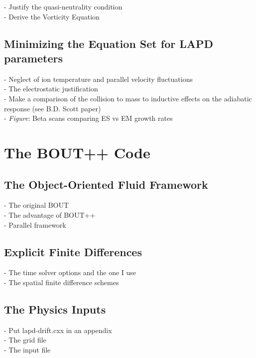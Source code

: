 \documentclass[12pt]{article}
\begin{document}
- Justify the quasi-neutrality condition \\
- Derive the Vorticity Equation \\

\subsection{Minimizing the Equation Set for LAPD parameters}

- Neglect of ion temperature and parallel velocity fluctuations \\
- The electrostatic justification \\
- Make a comparison of the collision to mass to inductive effects on the adiabatic response (see B.D. Scott paper) \\
- \emph{Figure}: Beta scans comparing ES vs EM growth rates \\

\section{The BOUT++ Code}

\subsection{The Object-Oriented Fluid Framework}

- The original BOUT \\
- The advantage of BOUT++ \\
- Parallel framework \\

\subsection{Explicit Finite Differences}

- The time solver options and the one I use \\
- The spatial finite difference schemes \\

\subsection{The Physics Inputs}

- Put lapd-drift.cxx in an appendix \\
- The grid file \\
- The input file \\
\end{document}
